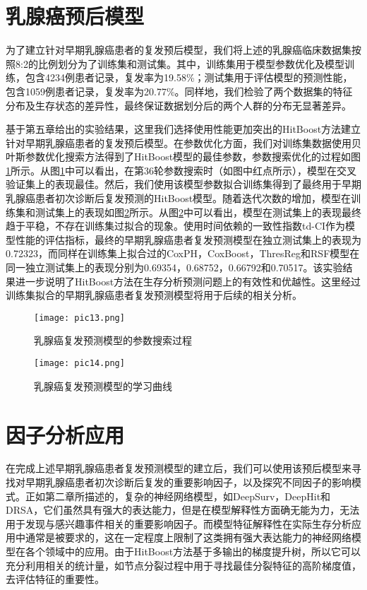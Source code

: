\section{乳腺癌预后模型}
为了建立针对早期乳腺癌患者的复发预后模型，我们将上述的乳腺癌临床数据集按照8:2的比例划分为了训练集和测试集。其中，训练集用于模型参数优化及模型训练，包含4234例患者记录，复发率为19.58\%；测试集用于评估模型的预测性能，包含1059例患者记录，复发率为20.77\%。同样地，我们检验了两个数据集的特征分布及生存状态的差异性，最终保证数据划分后的两个人群的分布无显著差异。

基于第五章给出的实验结果，这里我们选择使用性能更加突出的HitBoost方法建立针对早期乳腺癌患者的复发预后模型。在参数优化方面，我们对训练集数据使用贝叶斯参数优化搜索方法得到了HitBoost模型的最佳参数，参数搜索优化的过程如图\ref{pic13}所示。从图\ref{pic13}中可以看出，在第36轮参数搜索时（如图中红点所示），模型在交叉验证集上的表现最佳。然后，我们使用该模型参数拟合训练集得到了最终用于早期乳腺癌患者初次诊断后复发预测的HitBoost模型。随着迭代次数的增加，模型在训练集和测试集上的表现如图\ref{pic14}所示。从图\ref{pic14}中可以看出，模型在测试集上的表现最终趋于平稳，不存在训练集过拟合的现象。使用时间依赖的一致性指数td-CI作为模型性能的评估指标，最终的早期乳腺癌患者复发预测模型在独立测试集上的表现为0.72323，而同样在训练集上拟合过的CoxPH，CoxBoost，ThresReg和RSF模型在同一独立测试集上的表现分别为0.69354，0.68752，0.66792和0.70517。该实验结果进一步说明了HitBoost方法在生存分析预测问题上的有效性和优越性。这里经过训练集拟合的早期乳腺癌患者复发预测模型将用于后续的相关分析。

\begin{figure}[H]
\texttt{[image: pic13.png]}
\caption{乳腺癌复发预测模型的参数搜索过程}
\label{pic13}
\end{figure}

\begin{figure}[H]
\texttt{[image: pic14.png]}
\caption{乳腺癌复发预测模型的学习曲线}
\label{pic14}
\end{figure}

\section{因子分析应用}
在完成上述早期乳腺癌患者复发预测模型的建立后，我们可以使用该预后模型来寻找对早期乳腺癌患者初次诊断后复发的重要影响因子，以及探究不同因子的影响模式。正如第二章所描述的，复杂的神经网络模型，如DeepSurv，DeepHit和DRSA，它们虽然具有强大的表达能力，但是在模型解释性方面确无能为力，无法用于发现与感兴趣事件相关的重要影响因子。而模型特征解释性在实际生存分析应用中通常是被要求的，这在一定程度上限制了这类拥有强大表达能力的神经网络模型在各个领域中的应用。由于HitBoost方法基于多输出的梯度提升树，所以它可以充分利用相关的统计量，如节点分裂过程中用于寻找最佳分裂特征的高阶梯度值，去评估特征的重要性。

